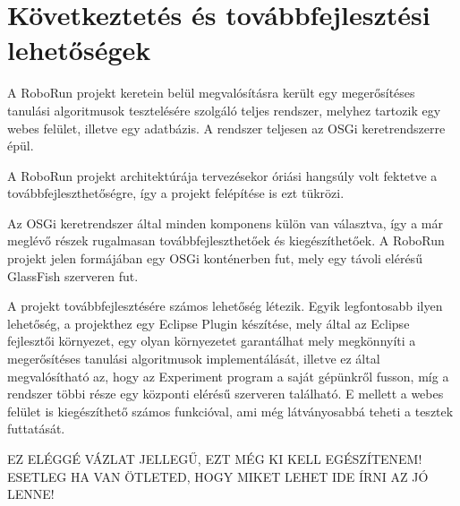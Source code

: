 \chapter{Következtetés és továbbfejlesztési lehetőségek}\label{ch:KOVETKEZTETESEK}

A RoboRun projekt keretein belül megvalósításra került egy megerősítéses tanulási algoritmusok tesztelésére szolgáló teljes rendszer, melyhez tartozik egy webes felület, illetve egy adatbázis. A rendszer teljesen az OSGi keretrendszerre épül.

A RoboRun projekt architektúrája tervezésekor óriási hangsúly volt fektetve a továbbfejleszthetőségre, így a projekt felépítése is ezt tükrözi.

Az OSGi keretrendszer által minden komponens külön van választva, így a már meglévő részek rugalmasan továbbfejleszthetőek és kiegészíthetőek. A RoboRun projekt jelen formájában egy OSGi konténerben fut, mely egy távoli elérésű GlassFish szerveren fut.

A projekt továbbfejlesztésére számos lehetőség létezik. Egyik legfontosabb ilyen lehetőség, a projekthez egy Eclipse Plugin\cite{eclipseplugin} készítése, mely által az Eclipse fejlesztői környezet, egy olyan környezetet garantálhat mely megkönnyíti a megerősítéses tanulási algoritmusok implementálását, illetve ez által megvalósítható az, hogy az Experiment program a saját gépünkről fusson, míg a rendszer többi része egy központi elérésű szerveren található.
E mellett a webes felület is kiegészíthető számos funkcióval, ami még látványosabbá teheti a tesztek futtatását.


EZ ELÉGGÉ VÁZLAT JELLEGŰ, EZT MÉG KI KELL EGÉSZÍTENEM!
 ESETLEG HA VAN ÖTLETED, HOGY MIKET LEHET IDE ÍRNI AZ JÓ LENNE!
